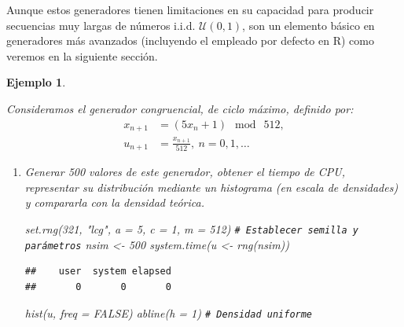 \documentclass[
]{book}
\newenvironment{Shaded}{\begin{snugshade}}{\end{snugshade}}
\newcommand{\AttributeTok}[1]{\textcolor[rgb]{0.77,0.63,0.00}{#1}}
\newcommand{\CommentTok}[1]{\textcolor[rgb]{0.56,0.35,0.01}{\textit{#1}}}
\newcommand{\ConstantTok}[1]{\textcolor[rgb]{0.00,0.00,0.00}{#1}}
\newcommand{\DecValTok}[1]{\textcolor[rgb]{0.00,0.00,0.81}{#1}}
\newcommand{\FunctionTok}[1]{\textcolor[rgb]{0.00,0.00,0.00}{#1}}
\newcommand{\NormalTok}[1]{#1}
\newcommand{\OtherTok}[1]{\textcolor[rgb]{0.56,0.35,0.01}{#1}}
\newcommand{\StringTok}[1]{\textcolor[rgb]{0.31,0.60,0.02}{#1}}
\theoremstyle{break}
\newtheorem{example}{Ejemplo}[chapter]
\theoremstyle{nonumberplain}
\renewcommand{\CommentTok}[1]{\textcolor[rgb]{0.41,0.41,0.41}{\texttt{#1}}}
\begin{document}
Aunque estos generadores tienen limitaciones en su capacidad para producir secuencias muy largas de números i.i.d. \(\mathcal{U}(0,1)\), son un elemento básico en generadores más avanzados (incluyendo el empleado por defecto en R) como veremos en la siguiente sección.

\begin{example}
\protect\hypertarget{exm:congru512}{}\label{exm:congru512}

Consideramos el generador congruencial, de ciclo máximo, definido por:
\[\begin{aligned}
x_{n+1}  & =(5x_{n}+1)\ \bmod\ 512,\nonumber\\
u_{n+1}  & =\frac{x_{n+1}}{512},\ n=0,1,\dots\nonumber
\end{aligned}\]

\begin{enumerate}
\def\labelenumi{\alph{enumi})}
\item
  Generar 500 valores de este generador, obtener el tiempo de CPU,
  representar su distribución mediante un histograma (en escala
  de densidades) y compararla con la densidad teórica.

\begin{Shaded}
\begin{Highlighting}[]
\FunctionTok{set.rng}\NormalTok{(}\DecValTok{321}\NormalTok{, }\StringTok{"lcg"}\NormalTok{, }\AttributeTok{a =} \DecValTok{5}\NormalTok{, }\AttributeTok{c =} \DecValTok{1}\NormalTok{, }\AttributeTok{m =} \DecValTok{512}\NormalTok{)  }\CommentTok{\# Establecer semilla y parámetros}
\NormalTok{nsim }\OtherTok{\textless{}{-}} \DecValTok{500}
\FunctionTok{system.time}\NormalTok{(u }\OtherTok{\textless{}{-}} \FunctionTok{rng}\NormalTok{(nsim)) }
\end{Highlighting}
\end{Shaded}

\begin{verbatim}
##    user  system elapsed 
##       0       0       0
\end{verbatim}

\begin{Shaded}
\begin{Highlighting}[]
\FunctionTok{hist}\NormalTok{(u, }\AttributeTok{freq =} \ConstantTok{FALSE}\NormalTok{)}
\FunctionTok{abline}\NormalTok{(}\AttributeTok{h =} \DecValTok{1}\NormalTok{)                   }\CommentTok{\# Densidad uniforme}
\end{Highlighting}
\end{Shaded}


\end{enumerate}
\end{example}
\end{document}
